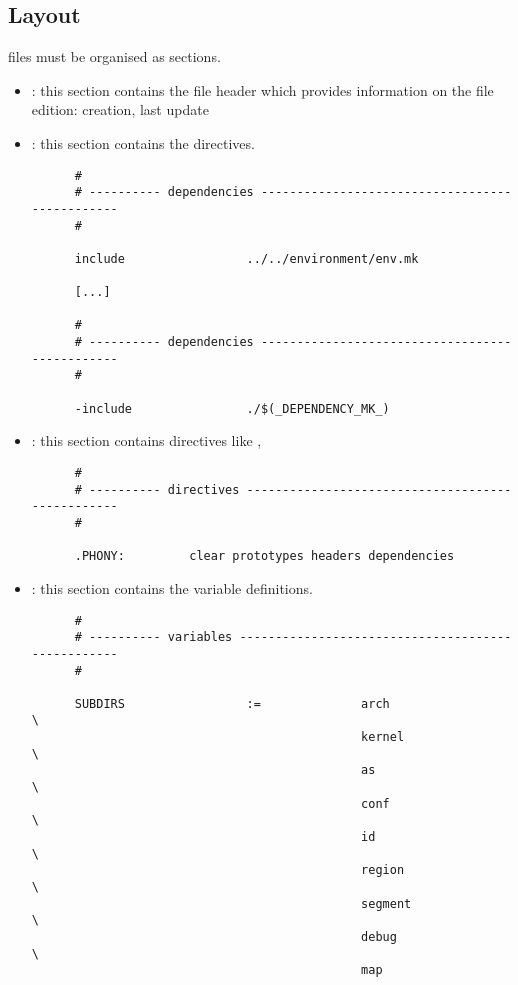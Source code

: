 
\subsection{Layout}

 files must be organised as sections.

\begin{itemize}
  \item
    : this section contains the file header which provides
    information on the file edition: creation, last update \etc{}
  \item
    : this section contains the 
    directives.

    \begin{verbatim}
      #
      # ---------- dependencies -----------------------------------------------
      #

      include                 ../../environment/env.mk

      [...]

      #
      # ---------- dependencies -----------------------------------------------
      #

      -include                ./$(_DEPENDENCY_MK_)
    \end{verbatim}
  \item
    : this section contains  directives
    like ,  \etc{}

    \begin{verbatim}
      #
      # ---------- directives -------------------------------------------------
      #

      .PHONY:         clear prototypes headers dependencies
    \end{verbatim}
  \item
    : this section contains the variable definitions.

    \begin{verbatim}
      #
      # ---------- variables --------------------------------------------------
      #

      SUBDIRS                 :=              arch                      \
                                              kernel                    \
                                              as                        \
                                              conf                      \
                                              id                        \
                                              region                    \
                                              segment                   \
                                              debug                     \
                                              map                       


\end{verbatim}
\end{itemize}
